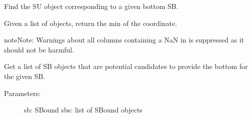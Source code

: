 \documentclass[letterpaper,10pt,english]{sphinxmanual}
\begin{document}

\begin{fulllineitems}
\label{\detokenize{hiegeo:hiegeo.get_SU_by_bot}}
Find the SU object corresponding to a given bottom SB.

\end{fulllineitems}


\begin{fulllineitems}
\label{\detokenize{hiegeo:hiegeo.get_allmin}}
Given a list of objects, return the min of the  coordinate.

\begin{sphinxadmonition}{note}{Note:}
Warnings about all columns containing a NaN in  is suppressed
as it should not be harmful.
\end{sphinxadmonition}

\end{fulllineitems}


\begin{fulllineitems}
\label{\detokenize{hiegeo:hiegeo.get_bot_sb}}
Get a list of SB objects that are potential candidates to
provide the bottom for the given SB.
\begin{description}
\item[{Parameters:}] \leavevmode
sb: SBound
sbs: list of SBound objects

\end{description}

\end{fulllineitems}

\end{document}
